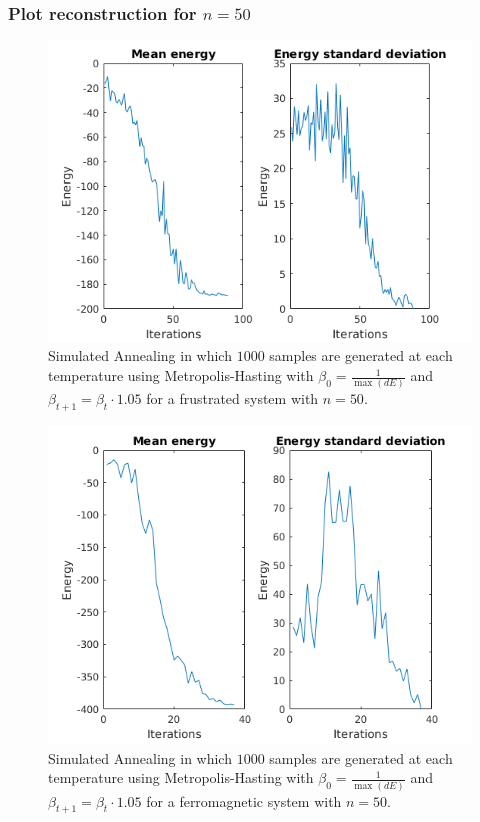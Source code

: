 \documentclass[10pt,a4paper]{article}
\begin{document}
\subsubsection{Plot reconstruction for $n=50$}
\begin{figure}[h]
\centering
\includegraphics[scale=0.6]{../sa/sa_frustrated.png}
\caption{Simulated Annealing in which $1000$ samples are generated at each temperature using Metropolis-Hasting with $\beta_0=\frac{1}{\max(dE)}$ and $\beta_{t+1} = \beta_t \cdot 1.05$ for a frustrated system with $n=50$.}
\label{fig:sa_frustrated}
\end{figure}

\begin{figure}[h]
\centering
\includegraphics[scale=0.6]{../sa/sa_ferromagnetic.png}
\caption{Simulated Annealing in which $1000$ samples are generated at each temperature using Metropolis-Hasting with $\beta_0=\frac{1}{\max(dE)}$ and $\beta_{t+1} = \beta_t \cdot 1.05$ for a ferromagnetic system with $n=50$.}
\label{fig:sa_ferromagnetic}
\end{figure}
\end{document}
